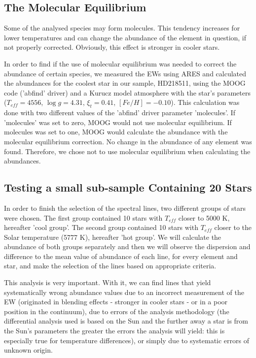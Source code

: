 \documentclass[dvips,12pt,a4paper]{report}
\begin{document}
{\subsection {The Molecular Equilibrium}

Some of the analysed species may form molecules. This tendency increases for lower temperatures and can change the abundance of the element in question, if not properly corrected. Obviously, this effect is stronger in cooler stars.

In order to find if the use of molecular equilibrium was needed to correct the abundance of certain species, we measured the EWs using ARES and calculated the abundances for the coolest star in our sample, HD218511, using the MOOG code ('abfind' driver) and a Kurucz model atmosphere with the star's parameters ($T_{eff}=4556$, $\log g=4.31$, $\xi_t=0.41$, $[Fe/H]=-0.10$).  This calculation was done with two different values of the 'abfind' driver parameter 'molecules'. If 'molecules' was set to zero, MOOG would not use molecular equilibrium. If molecules was set to one, MOOG would calculate the abundance with the molecular equilibrium correction. No change in the abundance of any element was found. Therefore, we chose not to use molecular equilibrium when calculating the abundances.

\subsection {Testing a small sub-sample Containing 20 Stars}
\label{20stars}
In order to finish the selection of the spectral lines, two different groups of stars were chosen. The first group contained 10 stars with $T_{eff}$ closer to 5000 K, hereafter 'cool group'. The second group contained 10 stars with $T_{eff}$ closer to the Solar temperature (5777 K), hereafter 'hot group'. We will calculate the abundance of both groups separately and then we will observe the dispersion and difference to the mean value of abundance of each line, for every element and star, and make the selection of the lines based on appropriate criteria. %

This analysis is very important. With it, we can find lines that yield systematically wrong abundance values due to an incorrect measurement of the EW (originated in blending effects - stronger in cooler stars - or in a poor position in the continuum), due to errors of the analysis methodology (the differential analysis used is based on the Sun and the further away a star is from the Sun's parameters the greater the errors the analysis will yield: this is especially true for temperature differences), or simply due to systematic errors of unknown origin.

}
\end{document}
